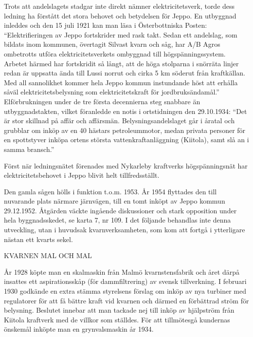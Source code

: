 Trots att andelslagets stadgar inte direkt nämner elektricitetsverk, torde dess ledning ha förstått det stora behovet och betydelsen för Jeppo. En utbyggnad inleddes och den 15 juli 1921 kan man läsa i Österbottniska Posten: ``Elektrifieringen av Jeppo fortskrider med rask takt. Sedan ett andelslag, som bildats inom kommunen, övertagit Silvast kvarn och såg, har A/B Agros ombetrotts utföra elektricitetsverkets ombyggnad till högspänningssystem. Arbetet härmed har fortskridit så långt, att de höga stolparna i snörräta linjer redan är uppsatta ända till Lussi norrut och cirka 5 km söderut från kraftkällan. Med all sannolikhet kommer hela Jeppo kommun instundande höst att erhålla såväl elektricitetsbelysning som elektricitetskraft för jordbruksändamål.''  Elförbrukningen under de tre första decennierna steg snabbare än utbyggnadstakten, vilket föranledde en notis i ortstidningen den 29.10.1934: ``Det är stor skillnad på affär och affärsmän. Belysningsandelslaget går i åratal och grubblar om inköp av en 40 hästars petroleummotor, medan privata personer för en spottstyver inköpa ortens största vattenkraftanläggning (Kiitola), samt slå an i samma bransch.''

Först när ledningsnätet förenades med Nykarleby kraftverks högspänningsnät har elektricitetsbehovet i Jeppo blivit helt tillfredsställt.


Den gamla sågen hölls i funktion t.o.m. 1953. År 1954 flyttades den till nuvarande plats närmare järnvägen, till en tomt inköpt av Jeppo kommun 29.12.1952. Åtgärden väckte ingående diskussioner och stark opposition under hela byggnadsskedet, se karta 7, nr 109. I det följande behandlas inte denna utveckling, utan i huvudsak kvarnverksamheten, som kom att fortgå i ytterligare nästan ett kvarts sekel.


KVARNEN MAL OCH MAL

År 1928 köpte man en skalmaskin från Malmö kvarnstensfabrik och året därpå insattes ett aspirationsskåp (för dammfiltrering) av svensk tillverkning. I februari 1930 godkände en extra stämma styrelsens förslag om inköp av nya turbiner med regulatorer för att få bättre kraft vid kvarnen och därmed en förbättrad ström för belysning. Beslutet innebar att man tackade nej till inköp av hjälpström från Kiitola kraftverk med de villkor som ställdes. För att tillmötesgå kundernas önskemål inköpte man en grynvalsmaskin år 1934.

